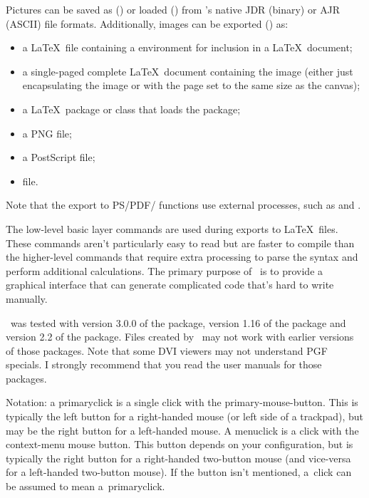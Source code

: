 Pictures can be saved as () or loaded
() from \FlowframTk's native \gls{JDR}
(binary) or \gls{AJR} (ASCII) file formats. Additionally, images can be
exported () as:

\begin{itemize}
    \item a \LaTeX\ file containing a  environment
    for inclusion in a \LaTeX\ document;

    \item a single-paged complete \LaTeX\ document containing the image
    (either just encapsulating the image or with the page set to the
    same size as the \gls{canvas});

    \item a \LaTeX\ package or class that loads the  package;

    \item a PNG file;

    \item a PostScript file;

    \item {} file.
\end{itemize}

Note that the export to PS/PDF/ functions use external
processes, such as  and .

The low-level  basic layer commands are used during
exports to \LaTeX\ files. These commands aren't particularly easy to
read but are faster to compile than the higher-level commands that
require extra processing to parse the syntax and perform additional
calculations. The primary purpose of \FlowframTk\ is to provide a
graphical interface that can generate complicated code that's hard
to write manually.

\FlowframTk\ was tested with version 3.0.0 of the 
package, version 1.16 of the  package and version
2.2 of the  package. Files created by \FlowframTk\
may not work with earlier versions of those packages. Note that some
DVI viewers may not understand PGF specials. I strongly recommend
that you read the user manuals for those packages.


Notation: a \gls{primaryclick} is a single click with the
\gls{primary-mouse-button}. This is typically the left button for a
right-handed mouse (or left side of a trackpad), but may be the
right button for a left-handed mouse. A \gls{menuclick} is a click
with the \gls{context-menu} mouse button. This button depends on your
configuration, but is typically the right button for a right-handed
two-button mouse (and vice-versa for a left-handed two-button mouse). 
If the button isn't mentioned, a~\gls{click} can
be assumed to mean a~\gls{primaryclick}.

